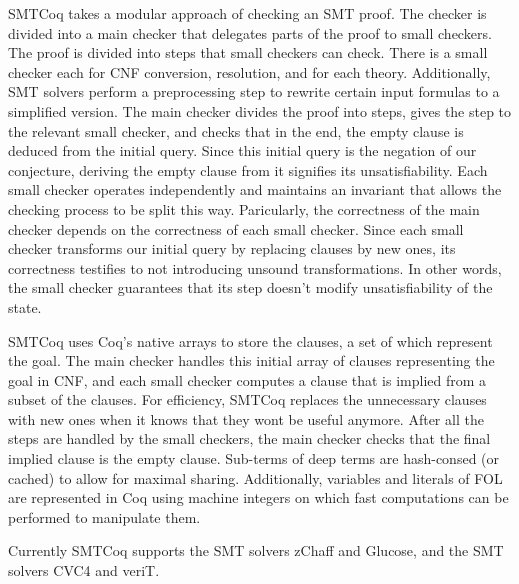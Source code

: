 \documentclass{article}
\begin{document}
	SMTCoq takes a modular approach of checking an
	SMT proof. The checker is divided into a main checker 
	that delegates parts of the proof to small checkers. 
	The proof is divided into steps that small checkers 
	can check. There is a small checker each for CNF 
	conversion, resolution, and for each theory. 
	Additionally, SMT solvers perform a preprocessing 
	step to rewrite certain input formulas to 
	a simplified version. The main checker divides the 
	proof into steps, gives the step to the relevant 
	small checker, and checks that in the 
	end, the empty clause is deduced from the initial query.
	Since this initial query is the negation of our 
	conjecture, deriving the empty clause from it 
	signifies its unsatisfiability. Each small checker 
	operates independently and maintains an invariant 
	that allows the checking process to be split this way.
	Paricularly, the correctness of the main checker 
	depends on the correctness of each small checker.
	Since each small checker transforms our initial 
	query by replacing clauses by new ones, its 
	correctness testifies to not introducing 
	unsound transformations. In other words, the 
	small checker guarantees that its step doesn't 
	modify unsatisfiability of the state.
	
	SMTCoq uses Coq's native arrays to store the clauses, 
	a set of which represent the goal. The main checker 
	handles this initial array of clauses representing the 
	goal in CNF, and each small checker computes a 
	clause that is implied from a subset of the clauses.
	For efficiency, SMTCoq replaces the unnecessary 
	clauses with new ones when it knows that they 
	wont be useful anymore. After all the steps 
	are handled by the small checkers, the main 
	checker checks that the final implied clause is 
	the empty clause. Sub-terms of deep terms 
	are hash-consed (or cached) to allow for maximal 
	sharing. Additionally, variables and literals 
	of FOL are represented in Coq using machine 
	integers on which fast computations can be 
	performed to manipulate them.
	
	Currently SMTCoq supports the SMT solvers 
	zChaff and Glucose, and the SMT solvers CVC4 and 
	veriT. 
	
\end{document}
